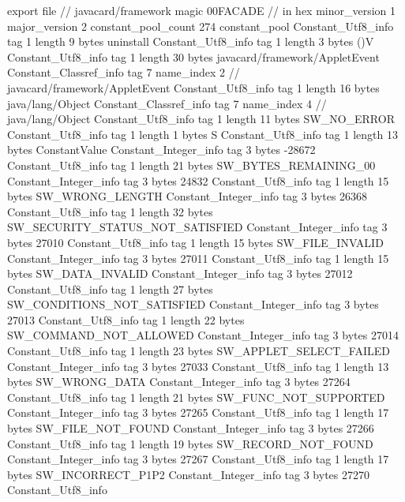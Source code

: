 export file {		// javacard/framework
	magic	00FACADE		 // in hex
	minor_version	1
	major_version	2
	constant_pool_count	274
	constant_pool {
		Constant_Utf8_info {
			tag	1
			length	9
			bytes	uninstall
		}
		Constant_Utf8_info {
			tag	1
			length	3
			bytes	()V
		}
		Constant_Utf8_info {
			tag	1
			length	30
			bytes	javacard/framework/AppletEvent
		}
		Constant_Classref_info {
			tag	7
			name_index	2		// javacard/framework/AppletEvent
		}
		Constant_Utf8_info {
			tag	1
			length	16
			bytes	java/lang/Object
		}
		Constant_Classref_info {
			tag	7
			name_index	4		// java/lang/Object
		}
		Constant_Utf8_info {
			tag	1
			length	11
			bytes	SW_NO_ERROR
		}
		Constant_Utf8_info {
			tag	1
			length	1
			bytes	S
		}
		Constant_Utf8_info {
			tag	1
			length	13
			bytes	ConstantValue
		}
		Constant_Integer_info {
			tag	3
			bytes	-28672
		}
		Constant_Utf8_info {
			tag	1
			length	21
			bytes	SW_BYTES_REMAINING_00
		}
		Constant_Integer_info {
			tag	3
			bytes	24832
		}
		Constant_Utf8_info {
			tag	1
			length	15
			bytes	SW_WRONG_LENGTH
		}
		Constant_Integer_info {
			tag	3
			bytes	26368
		}
		Constant_Utf8_info {
			tag	1
			length	32
			bytes	SW_SECURITY_STATUS_NOT_SATISFIED
		}
		Constant_Integer_info {
			tag	3
			bytes	27010
		}
		Constant_Utf8_info {
			tag	1
			length	15
			bytes	SW_FILE_INVALID
		}
		Constant_Integer_info {
			tag	3
			bytes	27011
		}
		Constant_Utf8_info {
			tag	1
			length	15
			bytes	SW_DATA_INVALID
		}
		Constant_Integer_info {
			tag	3
			bytes	27012
		}
		Constant_Utf8_info {
			tag	1
			length	27
			bytes	SW_CONDITIONS_NOT_SATISFIED
		}
		Constant_Integer_info {
			tag	3
			bytes	27013
		}
		Constant_Utf8_info {
			tag	1
			length	22
			bytes	SW_COMMAND_NOT_ALLOWED
		}
		Constant_Integer_info {
			tag	3
			bytes	27014
		}
		Constant_Utf8_info {
			tag	1
			length	23
			bytes	SW_APPLET_SELECT_FAILED
		}
		Constant_Integer_info {
			tag	3
			bytes	27033
		}
		Constant_Utf8_info {
			tag	1
			length	13
			bytes	SW_WRONG_DATA
		}
		Constant_Integer_info {
			tag	3
			bytes	27264
		}
		Constant_Utf8_info {
			tag	1
			length	21
			bytes	SW_FUNC_NOT_SUPPORTED
		}
		Constant_Integer_info {
			tag	3
			bytes	27265
		}
		Constant_Utf8_info {
			tag	1
			length	17
			bytes	SW_FILE_NOT_FOUND
		}
		Constant_Integer_info {
			tag	3
			bytes	27266
		}
		Constant_Utf8_info {
			tag	1
			length	19
			bytes	SW_RECORD_NOT_FOUND
		}
		Constant_Integer_info {
			tag	3
			bytes	27267
		}
		Constant_Utf8_info {
			tag	1
			length	17
			bytes	SW_INCORRECT_P1P2
		}
		Constant_Integer_info {
			tag	3
			bytes	27270
		}
		Constant_Utf8_info {
}}}
